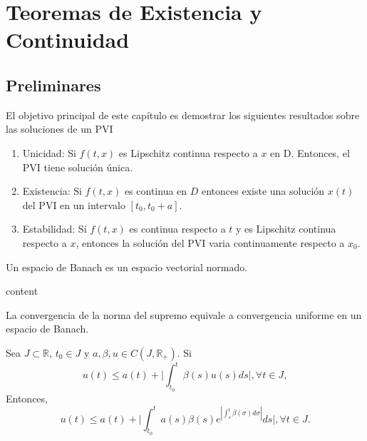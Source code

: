 \chapter{Teoremas de Existencia y Continuidad}

\section{Preliminares}

\begin{note}
  El objetivo principal de este capítulo es demostrar los siguientes resultados sobre las soluciones de un PVI
  \begin{enumerate}[label=(\roman*)]
    \item Unicidad: Si $f(t, x)$ es Lipschitz continua respecto a $x$ en D. Entonces, el PVI tiene solución única.
    \item Existencia: Si $f(t,x)$ es continua en $D$ entonces existe una solución $x(t)$ del PVI en un intervalo $[t_{0} , t_{0} + a]$.
    \item Estabilidad: Si $f(t,x)$ es continua respecto a $t$ y es Lipschitz continua respecto a $x$, entonces la solución del PVI varia continuamente respecto a $x_{0}$.
  \end{enumerate}
\end{note}

\begin{defn}
  Un espacio de Banach es un espacio vectorial normado.
\end{defn}

\begin{defn}[Operadores?]
  content
\end{defn}

\begin{obs}
  La convergencia de la norma del supremo equivale a convergencia uniforme en un espacio de Banach.
\end{obs}

\begin{lem}
  Sea $J \subset \mathbb{R}$, $t_{0} \in J$ y $a,\beta,u \in C(J,\mathbb{R}_{+})$. Si 
  \[ 
    u(t) \leq a(t) + \Big | \int_{t_{0}}^{t} \beta(s) u(s) ds \Big |, \forall t \in J, 
  \] 
  Entonces,
  \[ 
     u(t) \leq a(t) + \Big | \int_{t_{0}}^{t} a(s) \beta(s) e^{| \int_{s}^{t} \beta(\sigma) d\sigma |} ds \Big |, \forall t \in J.
  \] 
\end{lem}

